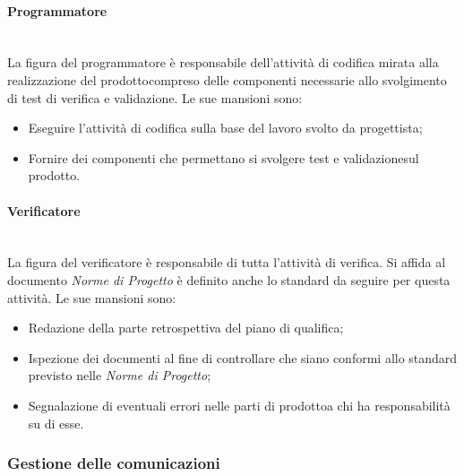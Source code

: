 			\paragraph{Programmatore}\mbox{}\\ [1mm]
				La figura del programmatore è responsabile dell'attività di codifica mirata alla realizzazione del prodotto\glosp compreso delle componenti necessarie allo svolgimento di test di verifica e validazione\glo.
				Le sue mansioni sono:
				\begin{itemize}
					\item Eseguire l'attività di codifica sulla base del lavoro svolto da progettista;
					\item Fornire dei componenti che permettano si svolgere test e validazione\glosp sul prodotto\glo.
				\end{itemize}
			\paragraph{Verificatore}\mbox{}\\ [1mm]
				La figura del verificatore è responsabile di tutta l'attività di verifica.
				Si affida al documento \textit{Norme di Progetto} è definito anche lo standard da seguire per questa attività.
				Le sue mansioni sono:
				\begin{itemize}
					\item Redazione della parte retrospettiva del piano di qualifica;
					\item Ispezione dei documenti al fine di controllare che siano conformi allo standard previsto nelle \textit{Norme di Progetto};
					\item Segnalazione di eventuali errori nelle parti di prodotto\glosp a chi ha responsabilità su di esse.
				\end{itemize}
		\subsubsection{Gestione delle comunicazioni}
